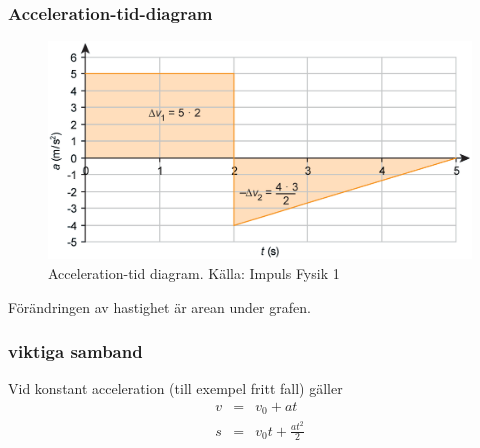 \documentclass[11pt]{beamer}
\begin{document}
    \begin{frame}
        \frametitle{Acceleration-tid-diagram}


        \begin{figure}[!h]
            \includegraphics[width=\textwidth]{../images/chapter3/accelerationTime.png}
            \caption{Acceleration-tid diagram. Källa: Impuls Fysik 1}
        \end{figure}
        Förändringen av hastighet är arean under grafen.


    \end{frame}
    \begin{frame}
        \frametitle{viktiga samband}
        Vid konstant acceleration (till exempel fritt fall) gäller
        \begin{eqnarray}
            v&=&v_0+at \\
            s&=&v_0 t +  \frac{at^2}{2}
        \end{eqnarray}
    \end{frame}
\end{document}
